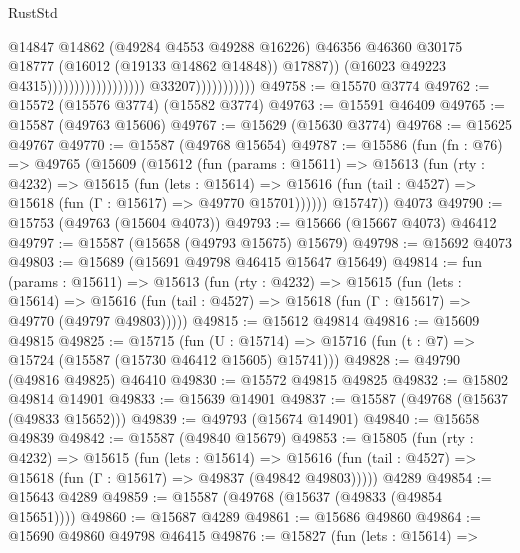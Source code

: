 \begin{lexlean}{RustStd}
\begin{coremodule}
                                                                @14847
                                                                @14862
                                                                (@49284 @4553 @49288 @16226)
                                                                @46356
                                                                @46360
                                                                @30175
                                                                @18777
                                                                (@16012 (@19133 @14862 @14848))
                                                                @17887))
                                                            (@16023 @49223 @4315))))))))))))))))))
                          @33207)))))))))))
@49758 := @15570 @3774
@49762 := @15572 (@15576 @3774) (@15582 @3774)
@49763 := @15591 @46409
@49765 := @15587 (@49763 @15606)
@49767 := @15629 (@15630 @3774)
@49768 := @15625 @49767
@49770 := @15587 (@49768 @15654)
@49787 := @15586
    (fun (fn : @76) =>
    @49765
      (@15609
        (@15612
          (fun (params : @15611) =>
          @15613
            (fun (rty : @4232) =>
            @15615
              (fun (lets : @15614) =>
              @15616 (fun (tail : @4527) => @15618 (fun (Γ : @15617) => @49770 @15701))))))
        @15747))
    @4073
@49790 := @15753 (@49763 (@15604 @4073))
@49793 := @15666 (@15667 @4073) @46412
@49797 := @15587 (@15658 (@49793 @15675) @15679)
@49798 := @15692 @4073
@49803 := @15689 (@15691 @49798 @46415 @15647 @15649)
@49814 := fun (params : @15611) =>
  @15613
    (fun (rty : @4232) =>
    @15615
      (fun (lets : @15614) =>
      @15616 (fun (tail : @4527) => @15618 (fun (Γ : @15617) => @49770 (@49797 @49803)))))
@49815 := @15612 @49814
@49816 := @15609 @49815
@49825 := @15715
    (fun (U : @15714) => @15716 (fun (t : @7) => @15724 (@15587 (@15730 @46412 @15605) @15741)))
@49828 := @49790 (@49816 @49825) @46410
@49830 := @15572 @49815 @49825
@49832 := @15802 @49814 @14901
@49833 := @15639 @14901
@49837 := @15587 (@49768 (@15637 (@49833 @15652)))
@49839 := @49793 (@15674 @14901)
@49840 := @15658 @49839
@49842 := @15587 (@49840 @15679)
@49853 := @15805
    (fun (rty : @4232) =>
    @15615
      (fun (lets : @15614) =>
      @15616 (fun (tail : @4527) => @15618 (fun (Γ : @15617) => @49837 (@49842 @49803)))))
    @4289
@49854 := @15643 @4289
@49859 := @15587 (@49768 (@15637 (@49833 (@49854 @15651))))
@49860 := @15687 @4289
@49861 := @15686 @49860
@49864 := @15690 @49860 @49798 @46415
@49876 := @15827
    (fun (lets : @15614) =>

\end{coremodule}
\end{lexlean}
